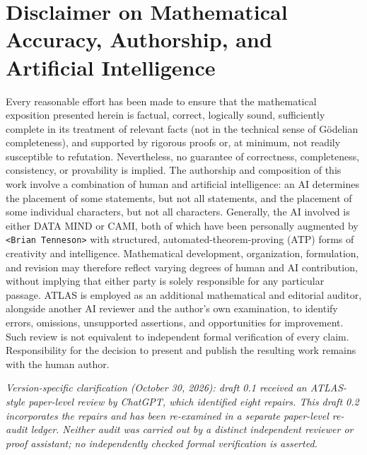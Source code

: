 \documentclass[11pt,letterpaper]{article}
\theoremstyle{definition}
\theoremstyle{remark}
\begin{document}
\clearpage
\section*{Disclaimer on Mathematical Accuracy, Authorship, and Artificial Intelligence}
Every reasonable effort has been made to ensure that the mathematical exposition presented herein is factual, correct, logically sound, sufficiently complete in its treatment of relevant facts (not in the technical sense of G\"odelian completeness), and supported by rigorous proofs or, at minimum, not readily susceptible to refutation. Nevertheless, no guarantee of correctness, completeness, consistency, or provability is implied. The authorship and composition of this work involve a combination of human and artificial intelligence: an AI determines the placement of some statements, but not all statements, and the placement of some individual characters, but not all characters. Generally, the AI involved is either DATA MIND or CAMI, both of which have been personally augmented by \texttt{<Brian Tenneson>} with structured, automated-theorem-proving (ATP) forms of creativity and intelligence. Mathematical development, organization, formulation, and revision may therefore reflect varying degrees of human and AI contribution, without implying that either party is solely responsible for any particular passage. ATLAS is employed as an additional mathematical and editorial auditor, alongside another AI reviewer and the author's own examination, to identify errors, omissions, unsupported assertions, and opportunities for improvement. Such review is not equivalent to independent formal verification of every claim. Responsibility for the decision to present and publish the resulting work remains with the human author.

\medskip\noindent\emph{Version-specific clarification (October 30, 2026): draft 0.1 received an ATLAS-style paper-level review by ChatGPT, which identified eight repairs. This draft 0.2 incorporates the repairs and has been re-examined in a separate paper-level re-audit ledger. Neither audit was carried out by a distinct independent reviewer or proof assistant; no independently checked formal verification is asserted.}
\end{document}
